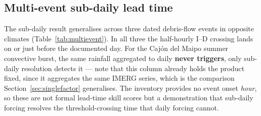 \documentclass[authoryear,preprint,review,12pt]{elsarticle}
\begin{document}
\subsection{Multi-event sub-daily lead time}
\label{sec:multievent}

The sub-daily result generalises across three dated debris-flow events in opposite
climates (Table~\ref{tab:multievent}). In all three the half-hourly I--D crossing
lands on or just before the documented day. For the Caj\'on del Maipo summer
convective burst, the same rainfall aggregated to daily \textbf{never triggers}, only
sub-daily resolution detects it --- note that this column already holds the product
fixed, since it aggregates the same IMERG series, which is the comparison
Section~\ref{sec:singlefactor} generalises. The inventory provides no event onset \emph{hour},
so these are not formal lead-time skill scores but a demonstration that sub-daily
forcing resolves the threshold-crossing time that daily forcing cannot.
\end{document}
